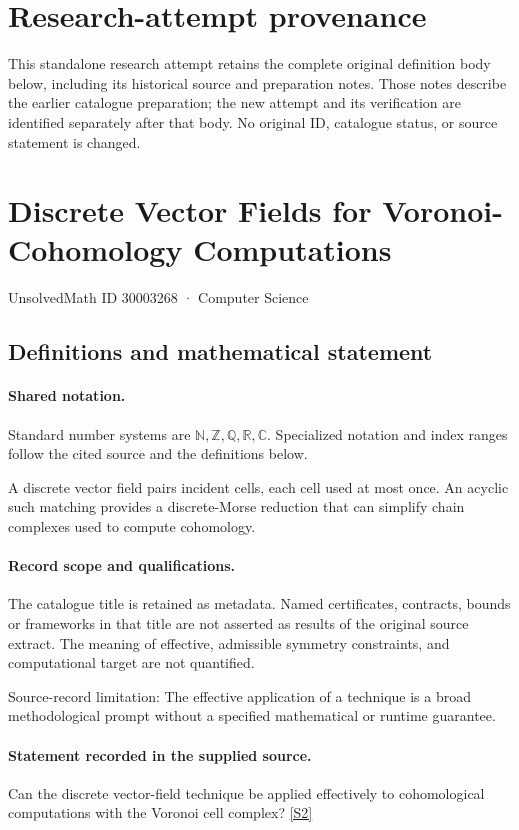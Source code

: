 \documentclass[11pt]{article}
\begin{document}
\section*{Research-attempt provenance}
This standalone research attempt retains the complete original definition body below,
including its historical source and preparation notes. Those notes describe the
earlier catalogue preparation; the new attempt and its verification are identified
separately after that body. No original ID, catalogue status, or source statement is changed.

\section{Discrete Vector Fields for Voronoi-Cohomology Computations}\label{30003268}
{\small UnsolvedMath ID 30003268 · Computer Science}
\subsection{Definitions and mathematical statement}

\paragraph{Shared notation.}Standard number systems are $\mathbb N,\mathbb Z,\mathbb Q,\mathbb R,\mathbb C$. Specialized notation and index ranges follow the cited source and the definitions below.


A discrete vector field pairs incident cells, each cell used at most once. An acyclic such matching provides a discrete-Morse reduction that can simplify chain complexes used to compute cohomology.
\paragraph{Record scope and qualifications.}
The catalogue title is retained as metadata. Named certificates, contracts, bounds or frameworks in that title are not asserted as results of the original source extract.
The meaning of effective, admissible symmetry constraints, and computational target are not quantified.

Source-record limitation: The effective application of a technique is a broad methodological prompt without a specified mathematical or runtime guarantee.
\paragraph{Statement recorded in the supplied source.}
Can the discrete vector-field technique be applied effectively to cohomological computations with the Voronoi cell complex? \href{https://doi.org/10.4171/owr/2016/52}{[S2]}
\end{document}
